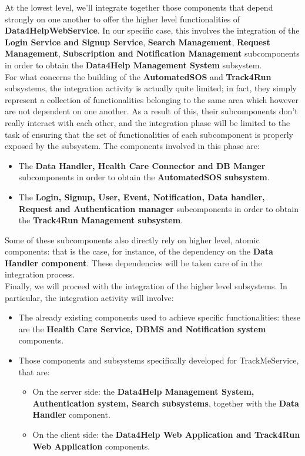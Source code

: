\documentclass[a4paper, hidelinks, 12pt]{report}
\begin{document}
	At the lowest level, we'll integrate together those components that depend strongly on one another to offer the higher level functionalities of \textbf{Data4HelpWebService}. In our specific case, this involves the integration of the \textbf{Login Service and Signup Service}, \textbf{Search Management}, \textbf{Request Management}, \textbf{Subscription and Notification Management} subcomponents in order to obtain the \textbf{Data4Help Management System} subsystem.\\
	
	For what concerns the building of the \textbf{AutomatedSOS} and \textbf{Track4Run} subsystems, the integration activity is actually quite limited; in fact, they simply represent a collection of functionalities belonging to the same area which however are not dependent on one another. As a result of this, their subcomponents don't really interact with each other, and the integration phase will be limited to the task of ensuring that the set of functionalities of each subcomponent is properly exposed by the subsystem. The components involved in this phase are:
	
	\begin{itemize}
	\item{} The \textbf{Data Handler, Health Care Connector and DB Manger} subcomponents in order to obtain the \textbf{AutomatedSOS subsystem}.
	\item{} The \textbf{Login, Signup, User, Event, Notification, Data handler, Request and  Authentication manager} subcomponents in order to obtain the \textbf{Track4Run Management subsystem}.
	\end{itemize}
		Some of these subcomponents also directly rely on higher level, atomic components: that is the case, for instance, of the dependency on the \textbf{Data Handler component}. These dependencies will be taken care of in the integration process.\\
		Finally, we will proceed with the integration of the higher level subsystems. In particular, the integration activity will involve:
	\begin{itemize}
		
	\item{} The already existing components used to achieve
specific functionalities: these are the \textbf{Health Care Service, DBMS and Notification system} components.
\item{} Those components and subsystems specifically developed for TrackMeService, that are:

	\begin{itemize}
	\item{} On the server side: the \textbf{Data4Help Management System, Authentication system, Search subsystems}, together with the \textbf{Data Handler} component.
	\item{} On the client side: the \textbf{Data4Help Web Application and Track4Run Web Application} components.
	\end{itemize}
			
	\end{itemize}
	
\end{document}
